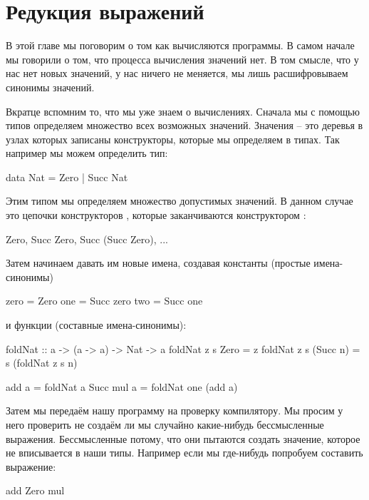 \chapter{Редукция выражений}

В этой главе мы поговорим о том как вычисляются программы. В самом
начале мы говорили о том, что процесса вычисления значений нет. В том
смысле, что у нас нет новых значений, у нас ничего не меняется, мы лишь
расшифровываем синонимы значений.

Вкратце вспомним то, что мы уже знаем о вычислениях. Сначала мы с
помощью типов определяем множество всех возможных значений. Значения --
это деревья в узлах которых записаны конструкторы, которые мы определяем
в типах. Так например мы можем определить тип:


\begin{code}
data Nat = Zero | Succ Nat
\end{code}

Этим типом мы определяем множество допустимых значений. В данном случае
это цепочки конструкторов , которые заканчиваются конструктором
:


\begin{code}
Zero, Succ Zero, Succ (Succ Zero), ...
\end{code}

Затем начинаем давать им новые имена, создавая константы (простые
имена-синонимы)


\begin{code}
zero    = Zero
one     = Succ zero
two     = Succ one
\end{code}

\noindent 

и функции (составные имена-синонимы):


\begin{code}
foldNat :: a -> (a -> a) -> Nat -> a
foldNat z  s  Zero      = z
foldNat z  s  (Succ n)  = s (foldNat z s n)

add a = foldNat a   Succ
mul a = foldNat one (add a) 
\end{code}

Затем мы передаём нашу программу на проверку компилятору. Мы просим у
него проверить не создаём ли мы случайно какие-нибудь бессмысленные
выражения. Бессмысленные потому, что они пытаются создать значение,
которое не вписывается в наши типы. Например если мы где-нибудь
попробуем составить выражение:


\begin{code}
add Zero mul
\end{code}

